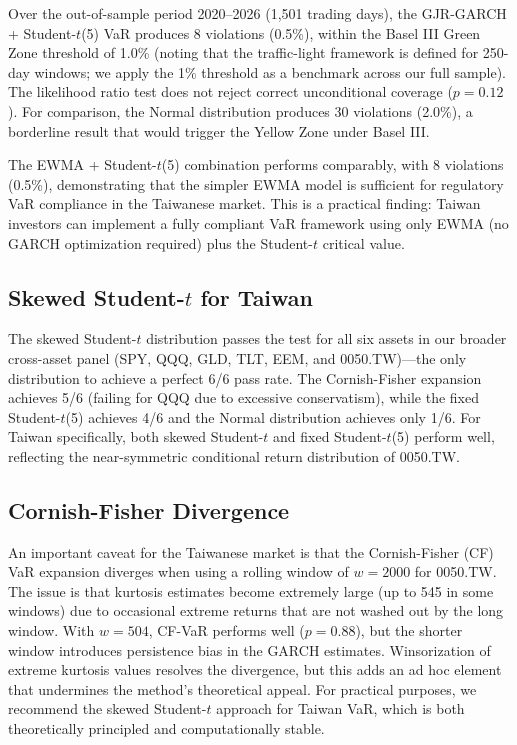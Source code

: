 Over the out-of-sample period 2020--2026 (1,501 trading days), the GJR-GARCH + Student-$t$(5) VaR produces 8 violations (0.5\%), within the Basel III Green Zone threshold of 1.0\% (noting that the traffic-light framework is defined for 250-day windows; we apply the 1\% threshold as a benchmark across our full sample). The \citet{kupiec1995} likelihood ratio test does not reject correct unconditional coverage ($p = 0.12$). For comparison, the Normal distribution produces 30 violations (2.0\%), a borderline result that would trigger the Yellow Zone under Basel III.

The EWMA + Student-$t$(5) combination performs comparably, with 8 violations (0.5\%), demonstrating that the simpler EWMA model is sufficient for regulatory VaR compliance in the Taiwanese market. This is a practical finding: Taiwan investors can implement a fully compliant VaR framework using only EWMA (no GARCH optimization required) plus the Student-$t$ critical value.

\subsection{Skewed Student-$t$ for Taiwan}

The skewed Student-$t$ distribution passes the \citet{kupiec1995} test for all six assets in our broader cross-asset panel (SPY, QQQ, GLD, TLT, EEM, and 0050.TW)---the only distribution to achieve a perfect 6/6 pass rate. The Cornish-Fisher expansion achieves 5/6 (failing for QQQ due to excessive conservatism), while the fixed Student-$t$(5) achieves 4/6 and the Normal distribution achieves only 1/6. For Taiwan specifically, both skewed Student-$t$ and fixed Student-$t$(5) perform well, reflecting the near-symmetric conditional return distribution of 0050.TW.

\subsection{Cornish-Fisher Divergence}

An important caveat for the Taiwanese market is that the Cornish-Fisher (CF) VaR expansion diverges when using a rolling window of $w = 2000$ for 0050.TW. The issue is that kurtosis estimates become extremely large (up to 545 in some windows) due to occasional extreme returns that are not washed out by the long window. With $w = 504$, CF-VaR performs well ($p = 0.88$), but the shorter window introduces persistence bias in the GARCH estimates. Winsorization of extreme kurtosis values resolves the divergence, but this adds an ad hoc element that undermines the method's theoretical appeal. For practical purposes, we recommend the skewed Student-$t$ approach for Taiwan VaR, which is both theoretically principled and computationally stable.


